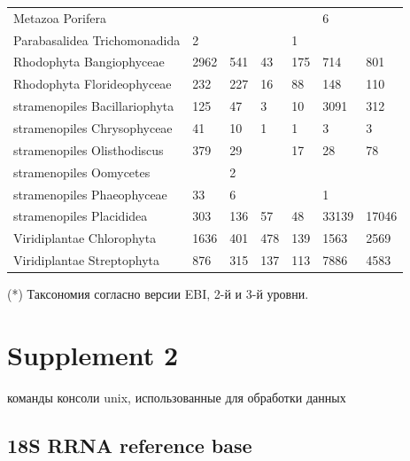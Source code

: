 \documentclass[a4paper]{article}
\begin{document}
\begin{tabular}{lllllll}
Metazoa Porifera&&&&&6&\\
Parabasalidea Trichomonadida&2&&&1&&\\
Rhodophyta Bangiophyceae&2962&541&43&175&714&801\\
Rhodophyta Florideophyceae&232&227&16&88&148&110\\
stramenopiles Bacillariophyta&125&47&3&10&3091&312\\
stramenopiles Chrysophyceae&41&10&1&1&3&3\\
stramenopiles Olisthodiscus&379&29&&17&28&78\\
stramenopiles Oomycetes&&2&&&&\\
stramenopiles Phaeophyceae&33&6&&&1&\\
stramenopiles Placididea&303&136&57&48&33139&17046\\
Viridiplantae Chlorophyta&1636&401&478&139&1563&2569\\
Viridiplantae Streptophyta&876&315&137&113&7886&4583\\
\hline
\end{tabular}

{\small(*) Таксономия согласно версии EBI, 2-й и 3-й уровни.}

\section{Supplement 2}

{\small команды консоли unix, использованные для обработки данных }

\subsection{18S RRNA reference base}
\end{document}
